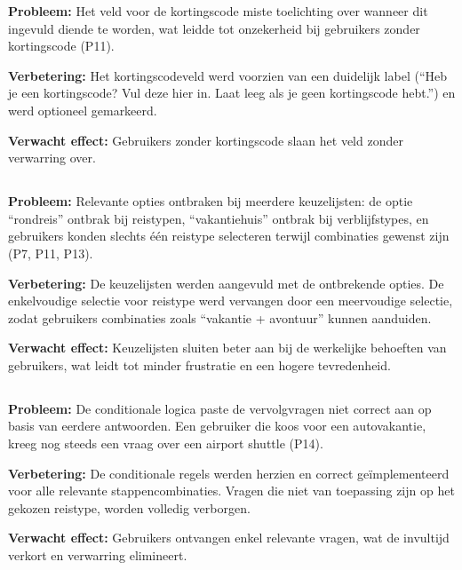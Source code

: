 \textbf{Probleem:} Het veld voor de kortingscode miste toelichting over wanneer dit ingevuld diende te worden, wat leidde tot onzekerheid bij gebruikers zonder kortingscode (P11).

\textbf{Verbetering:} Het kortingscodeveld werd voorzien van een duidelijk label (``Heb je een kortingscode? Vul deze hier in. Laat leeg als je geen kortingscode hebt.'') en werd optioneel gemarkeerd.

\textbf{Verwacht effect:} Gebruikers zonder kortingscode slaan het veld zonder verwarring over.

\subsection{}

\textbf{Probleem:} Relevante opties ontbraken bij meerdere keuzelijsten: de optie ``rondreis'' ontbrak bij reistypen, ``vakantiehuis'' ontbrak bij verblijfstypes, en gebruikers konden slechts één reistype selecteren terwijl combinaties gewenst zijn (P7, P11, P13).

\textbf{Verbetering:} De keuzelijsten werden aangevuld met de ontbrekende opties. De enkelvoudige selectie voor reistype werd vervangen door een meervoudige selectie, zodat gebruikers combinaties zoals ``vakantie + avontuur'' kunnen aanduiden.

\textbf{Verwacht effect:} Keuzelijsten sluiten beter aan bij de werkelijke behoeften van gebruikers, wat leidt tot minder frustratie en een hogere tevredenheid.

\subsection{}

\textbf{Probleem:} De conditionale logica paste de vervolgvragen niet correct aan op basis van eerdere antwoorden. Een gebruiker die koos voor een autovakantie, kreeg nog steeds een vraag over een airport shuttle (P14).

\textbf{Verbetering:} De conditionale regels werden herzien en correct geïmplementeerd voor alle relevante stappencombinaties. Vragen die niet van toepassing zijn op het gekozen reistype, worden volledig verborgen.

\textbf{Verwacht effect:} Gebruikers ontvangen enkel relevante vragen, wat de invultijd verkort en verwarring elimineert.

